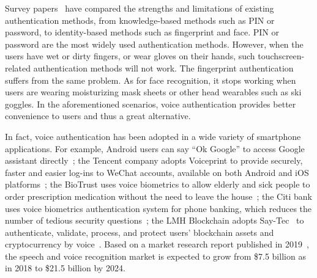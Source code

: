 Survey papers~\cite{vongsingthong2014survey,mahfouz2017survey,shankar2018survey} have compared the strengths and limitations of existing authentication methods, from knowledge-based methods such as PIN or password, to identity-based methods such as fingerprint and face.
%
PIN or password are the most widely used authentication methods. However, when the users have wet or dirty fingers, or wear gloves on their hands, such touchscreen-related authentication methods will not work. The fingerprint authentication suffers from the same problem. As for face recognition, it stops working when users are wearing moisturizing mask sheets or other head wearables such as ski goggles. In the aforementioned scenarios, voice authentication provides better convenience to users and thus a great alternative.


In fact, voice authentication has been adopted in a wide variety of smartphone applications. 
For example, Android users can say ``Ok Google'' to access Google assistant directly~\cite{onlinegoogle}; the Tencent company adopts Voiceprint to provide securely, faster and easier log-ins to WeChat accounts, available on both Android and iOS platforms~\cite{onlinewechat}; the BioTrust uses voice biometrics to allow elderly and sick people to order prescription medication without the need to leave the house~\cite{onlinebio}; the Citi bank uses voice biometrics authentication system for phone banking, which reduces the number of tedious security questions~\cite{onlineciti}; the LMH Blockchain adopts Say-Tec~\cite{onlinesaytec} to authenticate, validate, process, and protect users' blockchain assets and cryptocurrency by voice~\cite{onlineblockchain}.
%
Based on a market research report published in 2019~\cite{onlinemarket}, the speech and voice recognition market is expected to grow from 
 \$7.5 billion as in 2018 to  \$21.5 billion by 2024. 
 
 

